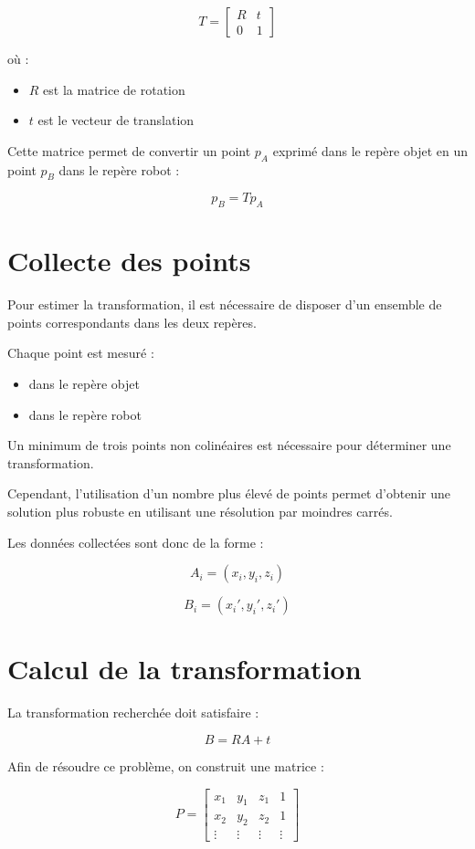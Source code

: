 \documentclass[a4paper,11pt]{article}
\begin{document}
\[
T =
\begin{bmatrix}
R & t \\
0 & 1
\end{bmatrix}
\]

où :

\begin{itemize}
\item $R$ est la matrice de rotation
\item $t$ est le vecteur de translation
\end{itemize}

Cette matrice permet de convertir un point $p_A$ exprimé dans le repère objet en un point $p_B$ dans le repère robot :

\[
p_B = T p_A
\]

\section{Collecte des points}

Pour estimer la transformation, il est nécessaire de disposer d’un ensemble de points correspondants dans les deux repères.

Chaque point est mesuré :

\begin{itemize}
\item dans le repère objet
\item dans le repère robot
\end{itemize}

Un minimum de trois points non colinéaires est nécessaire pour déterminer une transformation.

Cependant, l’utilisation d’un nombre plus élevé de points permet d’obtenir une solution plus robuste en utilisant une résolution par moindres carrés.

Les données collectées sont donc de la forme :

\[
A_i = (x_i, y_i, z_i)
\]

\[
B_i = (x_i', y_i', z_i')
\]

\section{Calcul de la transformation}

La transformation recherchée doit satisfaire :

\[
B = RA + t
\]

\newpage
Afin de résoudre ce problème, on construit une matrice :

\[
P =
\begin{bmatrix}
x_1 & y_1 & z_1 & 1 \\
x_2 & y_2 & z_2 & 1 \\
\vdots & \vdots & \vdots & \vdots
\end{bmatrix}
\]
\end{document}
